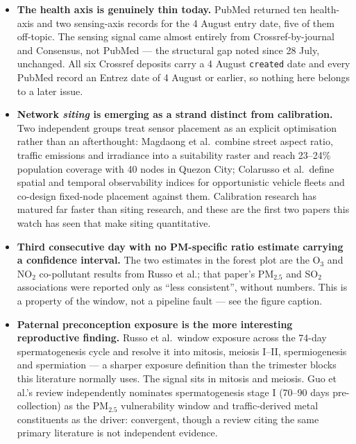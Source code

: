 \documentclass[10pt]{article}
\begin{document}
\footnotesize
\begin{itemize}\setlength{\itemsep}{1.1mm}
\item \textbf{The health axis is genuinely thin today.} PubMed returned ten health-axis
and two sensing-axis records for the 4 August entry date, five of them off-topic. The
sensing signal came almost entirely from Crossref-by-journal and Consensus, not PubMed
--- the structural gap noted since 28 July, unchanged. All six Crossref deposits carry a
4 August \texttt{created} date and every PubMed record an Entrez date of 4 August or
earlier, so nothing here belongs to a later issue.

\item \textbf{Network \emph{siting} is emerging as a strand distinct from calibration.}
Two independent groups treat sensor placement as an explicit optimisation rather than an
afterthought: Magdaong et al.\ combine street aspect ratio, traffic emissions and
irradiance into a suitability raster and reach 23--24\% population coverage with 40 nodes
in Quezon City; Colarusso et al.\ define spatial and temporal observability indices for
opportunistic vehicle fleets and co-design fixed-node placement against them. Calibration
research has matured far faster than siting research, and these are the first two papers
this watch has seen that make siting quantitative.

\item \textbf{Third consecutive day with no PM-specific ratio estimate carrying a
confidence interval.} The two estimates in the forest plot are the O$_3$ and NO$_2$
co-pollutant results from Russo et al.; that paper's PM$_{2.5}$ and SO$_2$ associations
were reported only as ``less consistent'', without numbers. This is a property of the
window, not a pipeline fault --- see the figure caption.

\item \textbf{Paternal preconception exposure is the more interesting reproductive
finding.} Russo et al.\ window exposure across the 74-day spermatogenesis cycle and
resolve it into mitosis, meiosis I--II, spermiogenesis and spermiation --- a sharper
exposure definition than the trimester blocks this literature normally uses. The signal
sits in mitosis and meiosis. Guo et al.'s review independently nominates spermatogenesis
stage I (70--90 days pre-collection) as the PM$_{2.5}$ vulnerability window and
traffic-derived metal constituents as the driver: convergent, though a review citing the
same primary literature is not independent evidence.


\end{itemize}
\end{document}
